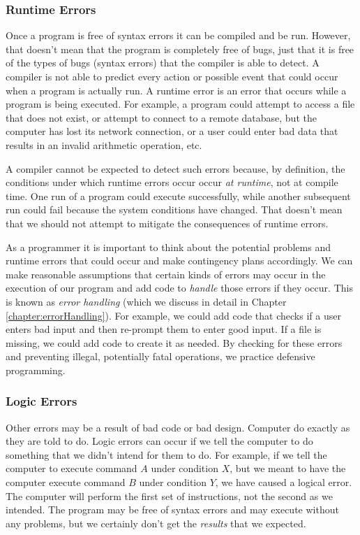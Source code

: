 \subsubsection{Runtime Errors}

Once a program is free of syntax errors it can be compiled and be run.  
However, that
doesn't mean that the program is completely free of bugs, just that it is free of
the types of bugs (syntax errors) that the compiler is able to detect.  A compiler
is not able to predict every action or possible event that could occur when a 
program is actually run.  A runtime error is an error that occurs while a program
is being executed.  For example, a program could attempt to access a file that
does not exist, or attempt to connect to a remote database, but the computer has lost
its network connection, or a user could enter bad data that results in an invalid
arithmetic operation, etc.

A compiler cannot be expected to detect such errors because, by definition, the 
conditions under which runtime errors occur occur \emph{at runtime}, not at 
compile time.  One run of a program could execute successfully, while another
subsequent run could fail because the system conditions have changed.  That
doesn't mean that we should not attempt to mitigate the consequences of runtime errors.

As a programmer it is important to think about the potential problems and
runtime errors that could occur and make contingency plans accordingly.
We can make reasonable assumptions that certain kinds of errors may 
occur in the execution of our program and add code to \emph{handle} 
those errors if they occur.  This is known as \emph{error handling} (which
we discuss in detail in Chapter \ref{chapter:errorHandling}).  For
example, we could add code that checks if a user enters bad input and
then re-prompt them to enter good input.  If a file is missing, we could add
code to create it as needed.  By checking for these errors and preventing
illegal, potentially fatal operations, we practice 
\gls{defensive programming}.

\subsubsection{Logic Errors}

Other errors may be a result of bad code or bad design.  Computer do 
exactly as they are told to do.  Logic errors can occur if we tell the
computer to do something that we didn't intend for them to do.  For example, 
if we tell the computer to execute command $A$ under condition $X$, but
we meant to have the computer execute command $B$ under condition $Y$, 
we have caused a logical error.  The computer will perform the first set of 
instructions, not the second as we intended.  The program may be free of
syntax errors and may execute without any problems, but we certainly don't
get the \emph{results} that we expected.  


